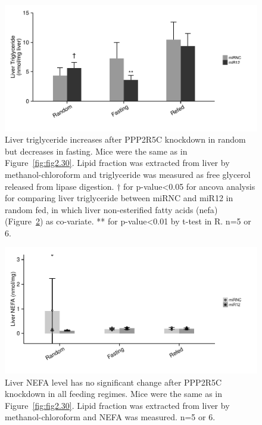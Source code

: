 \begin{figure}[htbp]
\centering
\includegraphics[width=1\textwidth]{figs/fig2-31 liver tag.pdf}
\caption[Liver triglyceride changes after PPP2R5C KD]{\footnotesize Liver triglyceride increases after PPP2R5C knockdown in random but decreases in fasting. Mice were the same as in Figure~\ref{fig:fig2.30}. Lipid fraction was extracted from liver by methanol-chloroform and triglyceride was measured as free glycerol released from lipase digestion. $\dagger$ for p-value<0.05 for \gls{ancova} analysis for comparing liver triglyceride between miRNC and miR12 in random fed, in which liver non-esterified fatty acids (\gls{nefa}) (Figure~\ref{fig:fig2.33}) as co-variate. ** for p-value<0.01 by t-test in R. n=5 or 6.}
\label{fig:fig2.31}
\end{figure}

\begin{figure}[htbp]
\centering
\includegraphics[width=1\textwidth]{figs/fig2-33 liver NEFA.pdf}
\caption[Liver NEFA has no change after PPP2R5C KD]{\footnotesize Liver NEFA level has no significant change after PPP2R5C knockdown in all feeding regimes. Mice were the same as in Figure~\ref{fig:fig2.30}. Lipid fraction was extracted from liver by methanol-chloroform and NEFA was measured. n=5 or 6.}
\label{fig:fig2.33}
\end{figure}


